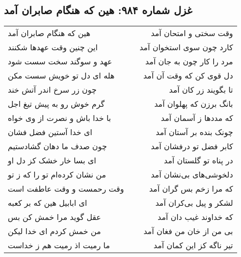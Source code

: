 \begin{center}
\section*{غزل شماره ۹۸۴: هین که هنگام صابران آمد}
\label{sec:0984}
\begin{longtable}{l p{0.5cm} r}
هین که هنگام صابران آمد
&&
وقت سختی و امتحان آمد
\\
این چنین وقت عهدها شکنند
&&
کارد چون سوی استخوان آمد
\\
عهد و سوگند سخت سست شود
&&
مرد را کار چون به جان آمد
\\
هله ای دل تو خویش سست مکن
&&
دل قوی کن که وقت آن آمد
\\
چون زر سرخ اندر آتش خند
&&
تا بگویند زر کان آمد
\\
گرم خوش رو به پیش تیغ اجل
&&
بانگ برزن که پهلوان آمد
\\
با خدا باش و نصرت از وی خواه
&&
که مددها ز آسمان آمد
\\
ای خدا آستین فضل فشان
&&
چونک بنده بر آستان آمد
\\
چون صدف ما دهان گشادستیم
&&
کابر فضل تو درفشان آمد
\\
ای بسا خار خشک کز دل او
&&
در پناه تو گلستان آمد
\\
من نشان کرده‌ام تو را که ز تو
&&
دلخوشی‌های بی‌نشان آمد
\\
وقت رحمست و وقت عاطفت است
&&
که مرا زخم بس گران آمد
\\
ای ابابیل هین که بر کعبه
&&
لشکر و پیل بی‌کران آمد
\\
عقل گوید مرا خمش کن بس
&&
که خداوند غیب دان آمد
\\
من خمش کردم ای خدا لیکن
&&
بی من از خان من فغان آمد
\\
ما رمیت اذ رمیت هم ز خداست
&&
تیر ناگه کز این کمان آمد
\\
\end{longtable}
\end{center}
